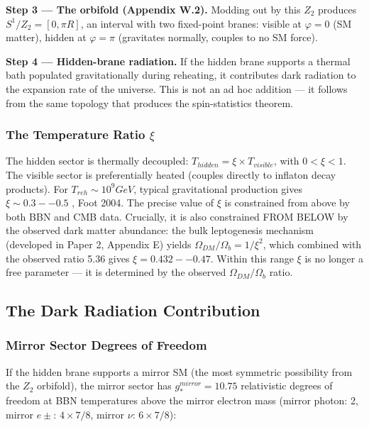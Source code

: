 \documentclass[aps,prd,preprint,superscriptaddress,longbibliography,floatfix]{revtex4-2}
\theoremstyle{remark}
\begin{document}
\textbf{Step 3 --- The orbifold (Appendix W.2).} Modding out by this $Z_{2}$ produces $S^{1}/Z_{2} = [0, \pi R]$, an interval with two fixed-point branes: visible at $\varphi = 0$ (SM matter), hidden at $\varphi = \pi$ (gravitates normally, couples to no SM force).

\textbf{Step 4 --- Hidden-brane radiation.} If the hidden brane supports a thermal bath populated gravitationally during reheating, it contributes dark radiation to the expansion rate of the universe. This is not an ad hoc addition --- it follows from the same topology that produces the spin-statistics theorem.


\subsubsection{The Temperature Ratio $\xi$}

The hidden sector is thermally decoupled: $T_{hidden} = \xi \times T_{visible}$, with $0 < \xi < 1$. The visible sector is preferentially heated (couples directly to inflaton decay products). For $T_{reh} \sim  10^{9} GeV$, typical gravitational production gives $\xi \sim  0.3--0.5$ \cite{Berezhiani2005}, Foot 2004. The precise value of $\xi$ is constrained from above by both BBN and CMB data. Crucially, it is also constrained FROM BELOW by the observed dark matter abundance: the bulk leptogenesis mechanism (developed in Paper 2, Appendix E) yields $\Omega_{DM}/\Omega_b = 1/\xi^{2}$, which combined with the observed ratio 5.36 gives $\xi = 0.432--0.47$. Within this range $\xi$ is no longer a free parameter --- it is determined by the observed $\Omega_{DM}/\Omega_b$ ratio.



\subsection{The Dark Radiation Contribution}


\subsubsection{Mirror Sector Degrees of Freedom}

If the hidden brane supports a mirror SM (the most symmetric possibility from the $Z_{2}$ orbifold), the mirror sector has $g_*^{mirror} = 10.75$ relativistic degrees of freedom at BBN temperatures above the mirror electron mass (mirror photon: 2, mirror $e\pm$: $4 \times 7/8$, mirror $\nu$: $6 \times 7/8$):
\end{document}
